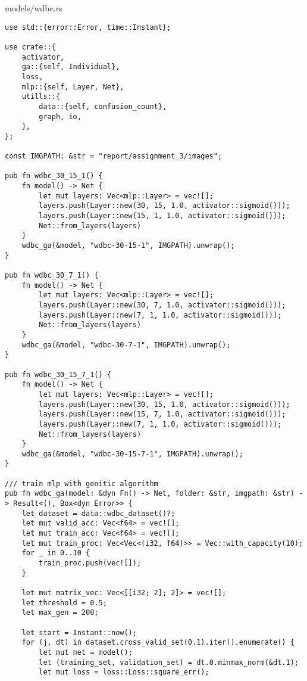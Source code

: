 \begin{code}  
\caption{models/wdbc.rs}
\label{src:wdbc}
\begin{verbatim}  
use std::{error::Error, time::Instant};

use crate::{
    activator,
    ga::{self, Individual},
    loss,
    mlp::{self, Layer, Net},
    utills::{
        data::{self, confusion_count},
        graph, io,
    },
};

const IMGPATH: &str = "report/assignment_3/images";

pub fn wdbc_30_15_1() {
    fn model() -> Net {
        let mut layers: Vec<mlp::Layer> = vec![];
        layers.push(Layer::new(30, 15, 1.0, activator::sigmoid()));
        layers.push(Layer::new(15, 1, 1.0, activator::sigmoid()));
        Net::from_layers(layers)
    }
    wdbc_ga(&model, "wdbc-30-15-1", IMGPATH).unwrap();
}

pub fn wdbc_30_7_1() {
    fn model() -> Net {
        let mut layers: Vec<mlp::Layer> = vec![];
        layers.push(Layer::new(30, 7, 1.0, activator::sigmoid()));
        layers.push(Layer::new(7, 1, 1.0, activator::sigmoid()));
        Net::from_layers(layers)
    }
    wdbc_ga(&model, "wdbc-30-7-1", IMGPATH).unwrap();
}

pub fn wdbc_30_15_7_1() {
    fn model() -> Net {
        let mut layers: Vec<mlp::Layer> = vec![];
        layers.push(Layer::new(30, 15, 1.0, activator::sigmoid()));
        layers.push(Layer::new(15, 7, 1.0, activator::sigmoid()));
        layers.push(Layer::new(7, 1, 1.0, activator::sigmoid()));
        Net::from_layers(layers)
    }
    wdbc_ga(&model, "wdbc-30-15-7-1", IMGPATH).unwrap();
}

/// train mlp with genitic algorithm
pub fn wdbc_ga(model: &dyn Fn() -> Net, folder: &str, imgpath: &str) -> Result<(), Box<dyn Error>> {
    let dataset = data::wdbc_dataset()?;
    let mut valid_acc: Vec<f64> = vec![];
    let mut train_acc: Vec<f64> = vec![];
    let mut train_proc: Vec<Vec<(i32, f64)>> = Vec::with_capacity(10);
    for _ in 0..10 {
        train_proc.push(vec![]);
    }

    let mut matrix_vec: Vec<[[i32; 2]; 2]> = vec![];
    let threshold = 0.5;
    let max_gen = 200;

    let start = Instant::now();
    for (j, dt) in dataset.cross_valid_set(0.1).iter().enumerate() {
        let mut net = model();
        let (training_set, validation_set) = dt.0.minmax_norm(&dt.1);
        let mut loss = loss::Loss::square_err();


\end{verbatim}
\end{code}
